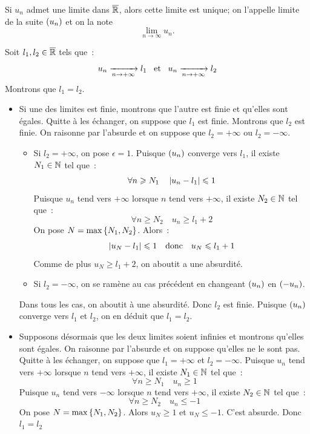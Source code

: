\documentclass{magnoliaold}
\begin{document}
\begin{proposition}[utile=-3]
Si $u_n$ admet une limite dans $\overline{\mathbb{R}}$, alors cette limite est unique; on
l'appelle limite de la suite $\left(u_n\right)$ et on la note
\[\lim_{n\to\infty} u_n.\]
\end{proposition}

\begin{preuve}
Soit $l_1,l_2\in\overline{\mathbb{R}}$ tels que~:
\[u_n \xrightarrow[n\rightarrow +\infty]{} l_1 \quad\!\text{et}\quad\!
  u_n \xrightarrow[n\rightarrow +\infty]{} l_2\]
Montrons que $l_1=l_2$.
\begin{itemize}
\item Si une des limites est finie, montrons que l'autre est finie et qu'elles
  sont égales. Quitte à les échanger, on suppose que $l_1$ est finie. Montrons
  que $l_2$ est finie. On raisonne par l'absurde et on suppose que
  $l_2=+\infty$ ou $l_2=-\infty$.
  \begin{itemize}
  \item Si $l_2=+\infty$, on pose $\epsilon=1$. Puisque $\left(u_n\right)$ converge
    vers $l_1$, il existe $N_1\in\mathbb{N}$ tel que~:
    \[\forall n\geqslant N_1 \quad \left|u_n-l_1\right|\leqslant 1\]
    Puisque $u_n$ tend vers $+\infty$ lorsque $n$ tend vers $+\infty$, il
    existe $N_2\in\mathbb{N}$ tel que~:
    \[\forall n\geq N_2 \quad u_n \geq l_1+2\]
    On pose $N=\max\left\{N_1,N_2\right\}$. Alors~:
    \[\left|u_N-l_1\right|\leqslant 1 \quad\text{donc}\quad u_N \leqslant l_1+1\]
    Comme de plus $u_N\geq l_1+2$, on aboutit a une absurdité.
  \item Si $l_2=-\infty$, on se ramène au cas précédent en changeant $\left(u_n\right)$
    en $\left(-u_n\right)$.
  \end{itemize}
  Dans tous les cas, on aboutit à une absurdité. Donc $l_2$ est finie.
  Puisque $\left(u_n\right)$ converge vers $l_1$ et $l_2$, on en déduit que $l_1=l_2$.
\item Supposons désormais que les deux limites soient infinies et montrons
  qu'elles sont égales. On raisonne par l'absurde et on suppose qu'elles ne le
  sont pas. Quitte à les échanger, on suppose que $l_1=+\infty$ et
  $l_2=-\infty$. Puisque $u_n$ tend vers $+\infty$ lorsque $n$ tend vers
  $+\infty$, il existe $N_1\in\mathbb{N}$ tel que~:
  \[\forall n\geq N_1 \quad u_n \geq 1\]
  Puisque $u_n$ tend vers $-\infty$ lorsque $n$ tend vers $+\infty$, il existe
  $N_2\in\mathbb{N}$ tel que~:
  \[\forall n\geq N_2 \quad u_n \leq -1\]
  On pose $N=\max\left\{N_1,N_2\right\}$. Alors $u_N \geq 1$ et $u_N \leq -1$. C'est
  absurde. Donc $l_1=l_2$
\end{itemize}
\end{preuve}
\end{document}
